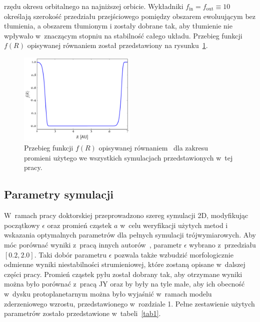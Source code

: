 rzędu okresu orbitalnego na najniższej orbicie.
Wykładniki $f_\textrm{in}=f_\textrm{out}\equiv10$ określają szerokość przedziału
przejściowego pomiędzy obszarem ewoluującym bez tłumienia, a obszarem tłumionym
i zostały dobrane tak, aby tłumienie nie wpływało w~znaczącym stopniu na
stabilność całego układu. Przebieg funkcji $f(R)$ opisywanej równaniem
 został przedstawiony na rysunku~\ref{fig:overlap}.
%
\begin{figure}
   \centering
   \includegraphics[width=0.5\textwidth]{figures/overlap}
   \caption[Funkcja tłumiąca w~zależności od promienia dysku.]
   {Przebieg funkcji $f(R)$ opisywanej równaniem~ dla
   zakresu promieni użytego we wszystkich symulacjach przedstawionych w~tej
   pracy.}
   \label{fig:overlap}
\end{figure}
%
\subsection{Parametry symulacji}\label{ch2:simpar}
%
W~ramach pracy doktorskiej przeprowadzono szereg symulacji 2D, modyfikując
początkowy $\epsilon$ oraz promień cząstek $a$ w~celu weryfikacji użytych metod
i wskazania optymalnych parametrów dla pełnych symulacji trójwymiarowych. Aby
móc porównać wyniki z~pracą innych autorów~\citep{JY07}, parametr $\epsilon$
wybrano z~przedziału $[0.2, 2.0]$. Taki dobór parametru $\epsilon$ pozwala także
wzbudzić morfologicznie odmienne wyniki niestabilności strumieniowej, które
zostaną opisane w~dalszej części pracy. Promień cząstek pyłu został dobrany tak,
aby otrzymane wyniki można było porównać z~pracą JY oraz by były na
tyle małe, aby ich obecność w~dysku protoplanetarnym można było wyjaśnić w~ramach
modelu zderzeniowego wzrostu, przedstawionego w~rozdziale 1. Pełne zestawienie
użytych parametrów zostało przedstawione w~tabeli~\ref{tab1}.

